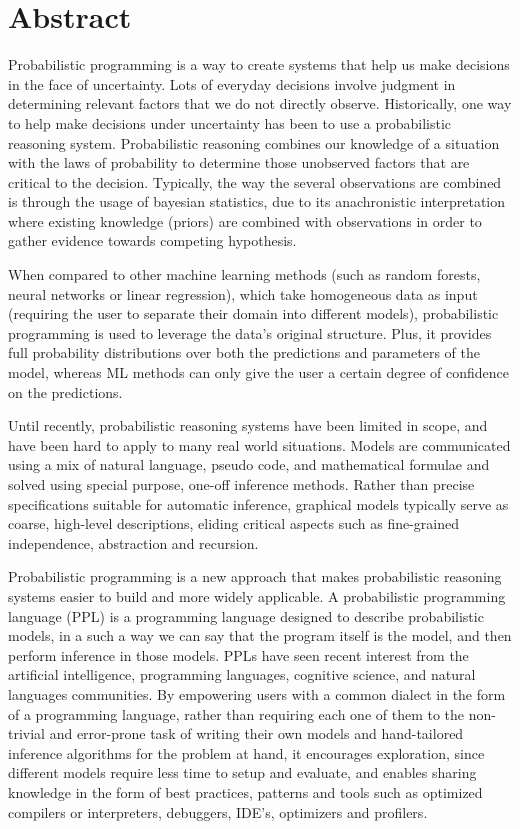 \chapter*{Abstract}

Probabilistic programming is a way to create systems that help us make decisions
 in the face of uncertainty. Lots of everyday decisions involve judgment in
determining relevant factors that we do not directly observe. Historically, one
way to help make decisions under uncertainty has been to use a probabilistic
reasoning system.
Probabilistic reasoning combines our knowledge of a situation with the laws of
probability to determine those unobserved factors that are critical to the
decision. Typically, the way the several observations are combined is through
the usage of bayesian statistics, due to its anachronistic interpretation where
existing knowledge (priors) are combined with observations in order to gather
evidence towards competing hypothesis.

When compared to other machine learning methods (such as random forests, neural
networks or linear regression), which take homogeneous data as input (requiring
the user to separate their domain into different models), probabilistic
 programming is used to leverage the data’s original structure. Plus, it
 provides full probability distributions over both the predictions and
 parameters of the model, whereas ML methods can only give the user a certain
 degree of confidence on the predictions.

Until recently, probabilistic reasoning systems have been limited in scope, and
have been hard to apply to many real world situations. Models are communicated
using a mix of natural language, pseudo code, and mathematical formulae and
solved using special purpose, one-off inference methods. Rather than precise
specifications suitable for automatic inference, graphical models typically
serve as coarse, high-level descriptions, eliding critical aspects such as
fine-grained independence, abstraction and recursion.

Probabilistic programming is a new approach that makes probabilistic reasoning
systems easier to build and more widely applicable. A probabilistic programming
language (PPL) is a programming language designed to describe probabilistic
models, in a such a way we can say that the program itself is the model, and
then perform inference in those models. PPLs have seen recent interest from the
artificial intelligence, programming languages, cognitive science, and natural
languages communities. By empowering users with a common dialect in the form of
a programming language, rather than requiring each one of them to the non-trivial
and error-prone task of writing their own models and hand-tailored inference
algorithms for the problem at hand, it encourages exploration, since different
models require less time to setup and evaluate, and enables sharing knowledge
in the form of best practices, patterns and tools such as optimized compilers
or interpreters, debuggers, IDE’s, optimizers and profilers.

